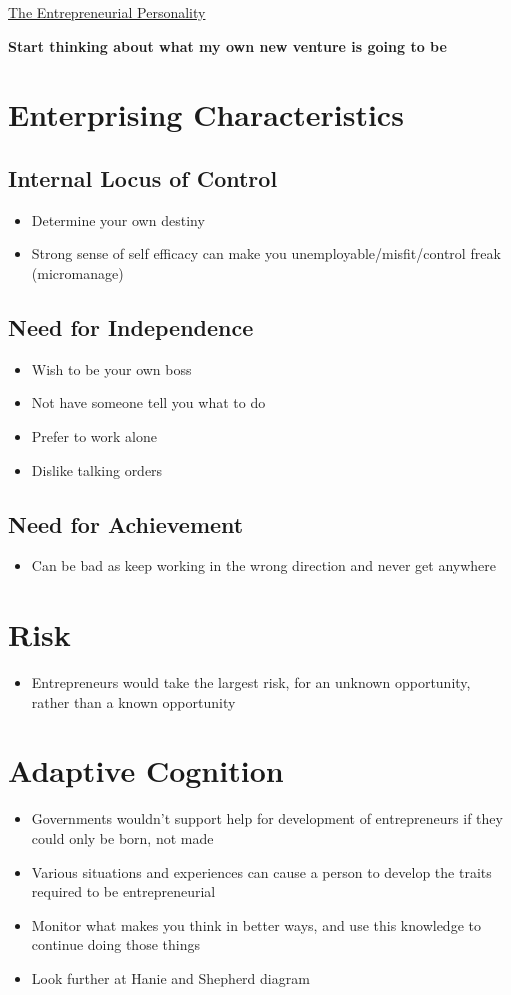 \documentclass{article}[18pt]
\begin{document}
\begin{center}
\underline{\huge The Entrepreneurial Personality}
\end{center}
{\Large \textbf{Start thinking about what my own new venture is going to be}}


\section{Enterprising Characteristics}
\subsection{Internal Locus of Control}
\begin{itemize}
\item Determine your own destiny
\item Strong sense of self efficacy can make you unemployable/misfit/control freak (micromanage)
\end{itemize}
\subsection{Need for Independence}
\begin{itemize}
\item Wish to be your own boss
\item Not have someone tell you what to do
\item Prefer to work alone
\item Dislike talking orders
\end{itemize}

\subsection{Need for Achievement}
\begin{itemize}
\item Can be bad as keep working in the wrong direction and never get anywhere
\end{itemize}

\section{Risk}
\begin{itemize}
\item Entrepreneurs would take the largest risk, for an unknown opportunity, rather than a known opportunity
\end{itemize}
\section{Adaptive Cognition}
\begin{itemize}
\item Governments wouldn't support help for development of entrepreneurs if they could only be born, not made
\item Various situations and experiences can cause a person to develop the traits required to be entrepreneurial 
\item Monitor what makes you think in better ways, and use this knowledge to continue doing those things
\item Look further at Hanie and Shepherd diagram
\end{itemize}
\end{document}
